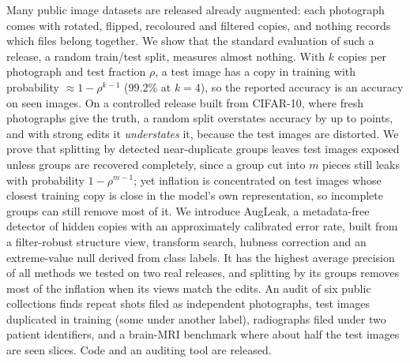 Many public image datasets are released already augmented: each photograph comes with rotated, flipped, recoloured and filtered copies, and nothing records which files belong together. We show that the standard evaluation of such a release, a random train/test split, measures almost nothing. With $k$ copies per photograph and test fraction $\rho$, a test image has a copy in training with probability $\approx1-\rho^{k-1}$ ($99.2\%$ at $k=4$), so the reported accuracy is an accuracy on seen images. On a controlled release built from CIFAR-10, where fresh photographs give the truth, a random split overstates accuracy by up to \numWeakGapKnn{} points, and with strong edits it \emph{understates} it, because the test images are distorted. We prove that splitting by detected near-duplicate groups leaves test images exposed unless groups are recovered completely, since a group cut into $m$ pieces still leaks with probability $1-\rho^{m-1}$; yet inflation is concentrated on test images whose closest training copy is close in the model's own representation, so incomplete groups can still remove most of it. We introduce AugLeak, a metadata-free detector of hidden copies with an approximately calibrated error rate, built from a filter-robust structure view, transform search, hubness correction and an extreme-value null derived from class labels. It has the highest average precision of all methods we tested on two real releases, and splitting by its groups removes most of the inflation when its views match the edits. An audit of six public collections finds repeat shots filed as independent photographs, test images duplicated in training (some under another label), radiographs filed under two patient identifiers, and a brain-MRI benchmark where about half the test images are seen slices. Code and an auditing tool are released.
